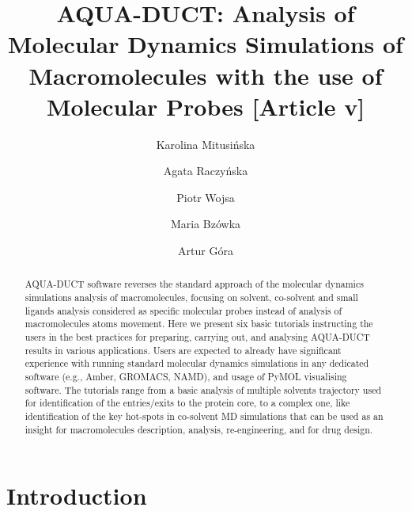 \documentclass[9pt,tutorial]{livecoms}
\title{AQUA-DUCT: Analysis of Molecular Dynamics Simulations of Macromolecules with the use of Molecular Probes [Article v\versionnumber]}
\author[1\authfn{1}]{Karolina Mitusińska}
\author[1\authfn{1}]{Agata Raczyńska}
\author[1\authfn{1}]{Piotr Wojsa}
\author[1]{Maria Bzówka}
\author[1*]{Artur Góra}
\affil[1]{Tunneling Group, Silesian University of Technology, Bolesława Krzywoustego 8, Gliwice, Poland}
\begin{document}
\lstset{upquote=true}
\begin{frontmatter}
\maketitle

\begin{abstract}
AQUA-DUCT software reverses the standard approach of the molecular dynamics simulations analysis of macromolecules, focusing on solvent, co-solvent and small ligands analysis considered as specific molecular probes instead of analysis of macromolecules atoms movement. Here we present six basic tutorials instructing the users in the best practices for preparing, carrying out, and analysing AQUA-DUCT results in various applications. Users are expected to already have significant experience with running standard molecular dynamics simulations in any dedicated software (e.g., Amber, GROMACS, NAMD), and usage of PyMOL visualising software. The tutorials range from a basic analysis of multiple solvents trajectory used for identification of the entries/exits to the protein core, to a complex one, like identification of the key hot-spots in co-solvent MD simulations that can be used as an insight for macromolecules description, analysis, re-engineering, and for drug design. 

\end{abstract}

\end{frontmatter}

\section{Introduction}
\end{document}
